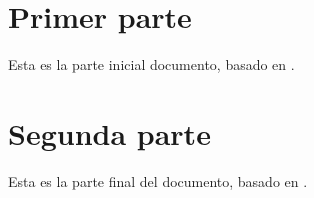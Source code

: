 \documentclass[a4paper,12pt]{article}
\begin{document}
	\section{Primer parte}
	\begin{refsection}
		Esta es la parte inicial documento, basado en \cite{guia1}.
		\printbibliography[heading=subbibliography]
	\end{refsection}
	
	\section{Segunda parte}
	\begin{refsection}
		Esta es la parte final del documento, basado en \cite{biber}.
		\printbibliography[heading=subbibliography]
	\end{refsection}
\end{document}
